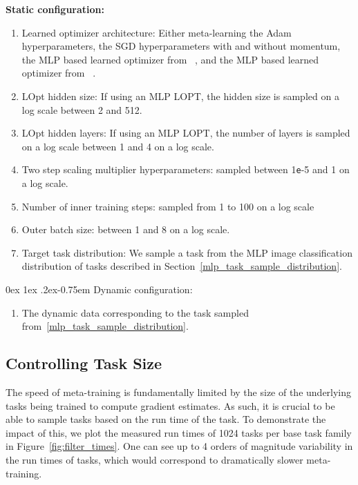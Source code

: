 \documentclass[11pt]{article}
\makeatletter
\renewcommand{\paragraph}{%
  \@startsection{paragraph}{4}%
  {\z@}{0ex \@plus 1ex \@minus .2ex}{-0.75em}%
  {\normalfont\normalsize\bfseries}%
}
\newcommand{\e}{\texttt{e}}
\makeatother
\begin{document}
\textbf{Static configuration:}
\begin{enumerate}
    \item Learned optimizer architecture: Either meta-learning the Adam hyperparameters, the SGD hyperparameters with and without momentum, the MLP based learned optimizer from ~\citep{metz2019understanding}, and the MLP based learned optimizer from ~\citep{metz2022practical}.
    \item LOpt hidden size: If using an MLP LOPT, the hidden size is sampled on a log scale between 2 and 512.
    \item LOpt hidden layers: If using an MLP LOPT, the number of layers is sampled on a log scale between 1 and 4 on a log scale.
    \item Two step scaling multiplier hyperparameters: sampled between 1\e-5 and 1 on a log scale.
    \item Number of inner training steps: sampled from 1 to 100 on a log scale
    \item Outer batch size: between 1 and 8 on a log scale.
    \item Target task distribution: We sample a task from the MLP image classification distribution of tasks described in Section~\ref{mlp_task_sample_distribution}.
\end{enumerate}

\paragraph{Dynamic configuration:}
\begin{enumerate}
    \item The dynamic data corresponding to the task sampled from~\ref{mlp_task_sample_distribution}.
\end{enumerate}

\subsection{Controlling Task Size} \label{app:cfg_to_nn}
The speed of meta-training is fundamentally limited by the size of the underlying tasks being trained to compute gradient estimates. 
As such, it is crucial to be able to sample tasks based on the run time of the task.
To demonstrate the impact of this, we plot the measured run times of 1024 tasks per base task family in Figure~\ref{fig:filter_times}. One can see up to 4 orders of magnitude variability in the run times of tasks, which would correspond to dramatically slower meta-training.
\end{document}
